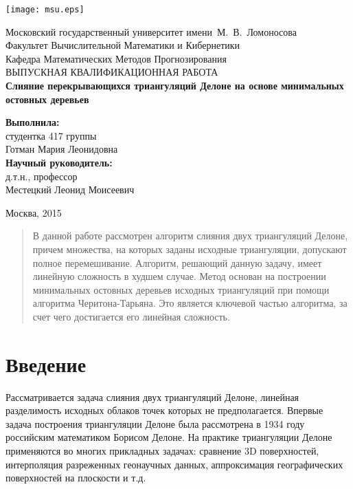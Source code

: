 \documentclass[12pt]{article}
\begin{document}
\begin{titlepage}
\begin{center}

	\texttt{[image: msu.eps]}
	
	\bigskip

	Московский государственный университет имени~М.~В.~Ломоносова\\
	Факультет Вычислительной Математики и Кибернетики\\
	Кафедра Математических Методов Прогнозирования\\[30mm]

	\textsf{\large
      ВЫПУСКНАЯ КВАЛИФИКАЦИОННАЯ РАБОТА\\[10mm]
      \textbf{
        Слияние перекрывающихся триангуляций Делоне на основе минимальных остовных деревьев
      }
    }\\[30mm]
	
	\begin{flushright}
      \parbox{0.5\textwidth}{
        \raggedleft
        \textbf{Выполнила:}\\
        студентка 417 группы\\
        Готман Мария Леонидовна\\[5mm]
        \textbf{Научный руководитель:}\\
        д.т.н., профессор\\
        Местецкий Леонид Моисеевич
      }
    \end{flushright}	
	
	\vspace{\fill}
	Москва, 2015
\end{center}
\end{titlepage}

\newpage

\tableofcontents

\newpage
\begin{abstract}
В данной работе рассмотрен алгоритм слияния двух триангуляций Делоне,
причем множества, на которых заданы исходные триангуляции, допускают полное перемешивание.
Алгоритм, решающий данную задачу, имеет линейную сложность в худшем случае.
Метод основан на построении минимальных остовных деревьев исходных триангуляций
при помощи алгоритма Черитона-Тарьяна.
Это является ключевой частью алгоритма, за счет чего достигается его линейная сложность.
\end{abstract}

\newpage
\section{Введение}
Рассматривается задача слияния двух триангуляций Делоне, линейная разделимость исходных облаков точек которых не предполагается.
Впервые задача построения триангуляции Делоне была рассмотрена в 1934 году российским математиком Борисом Делоне.
На практике триангуляции Делоне применяются во многих прикладных задачах:
сравнение 3D поверхностей, интерполяция разреженных геонаучных данных,
аппроксимация географических поверхностей на плоскости и т.д.
\end{document}

